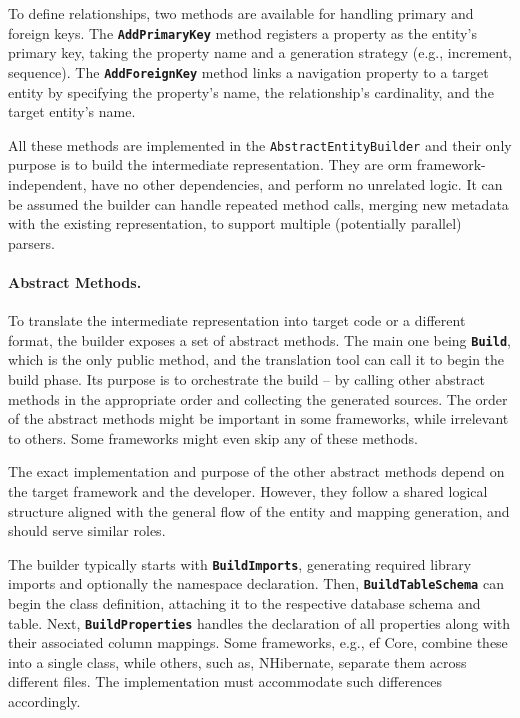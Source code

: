 To define relationships, two methods are available for handling primary and foreign keys. The \texttt{\textbf{AddPrimaryKey}} method registers a property as the entity’s primary key, taking the property name and a generation strategy (e.g., increment, sequence). The \texttt{\textbf{AddForeignKey}} method links a navigation property to a target entity by specifying the property's name, the relationship's cardinality, and the target entity's name.

All these methods are implemented in the \texttt{AbstractEntityBuilder} and their only purpose is to build the intermediate representation. They are \acrshort{orm} framework-independent, have no other dependencies, and perform no unrelated logic. It can be assumed the builder can handle repeated method calls, merging new metadata with the existing representation, to support multiple (potentially parallel) parsers. 

\paragraph{Abstract Methods.}
To translate the intermediate representation into target code or a different format, the builder exposes a set of abstract methods. The main one being \texttt{\textbf{Build}}, which is the only public method, and the translation tool can call it to begin the build phase. Its purpose is to orchestrate the build -- by calling other abstract methods in the appropriate order and collecting the generated sources. The order of the abstract methods might be important in some frameworks, while irrelevant to others. Some frameworks might even skip any of these methods.

The exact implementation and purpose of the other abstract methods depend on the target framework and the developer. However, they follow a shared logical structure aligned with the general flow of the entity and mapping generation, and should serve similar roles. 

The builder typically starts with \texttt{\textbf{BuildImports}}, generating required library imports and optionally the namespace declaration. Then, \texttt{\textbf{BuildTableSchema}} can begin the class definition, attaching it to the respective database schema and table. 
Next, \texttt{\textbf{BuildProperties}} handles the declaration of all properties along with their associated column mappings. Some frameworks, e.g., \acrshort{ef} Core, combine these into a single class, while others, such as, NHibernate, separate them across different files. The implementation must accommodate such differences accordingly.

